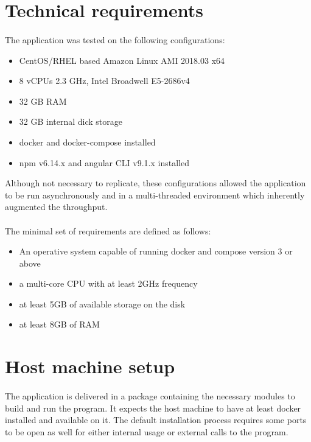 \documentclass{scrreprt}
\begin{document}
\section{Technical requirements}
\paragraph{}The application was tested on the following configurations:
\begin{itemize}
	\item CentOS/RHEL based Amazon Linux AMI 2018.03 x64
	\item 8 vCPUs 2.3 GHz, Intel Broadwell E5-2686v4
	\item 32 GB RAM
	\item 32 GB internal dick storage
	\item docker and docker-compose installed
	\item npm v6.14.x and angular CLI v9.1.x installed 
\end{itemize}
Although not necessary to replicate, these configurations allowed the application to be run asynchronously and in a multi-threaded environment which inherently augmented the throughput.


\paragraph{}The minimal set of requirements are defined as follows:
\begin{itemize}
	\item An operative system capable of running docker and compose version 3 or above
	\item a multi-core CPU with at least 2GHz  frequency
	\item at least 5GB of available storage on the disk
	\item at least 8GB of RAM
\end{itemize}


\section{Host machine setup}
\paragraph{}The application is delivered in a package containing the necessary modules to build and run the program. It expects the host machine to have at least docker installed and available on it. The default installation process requires some ports to be open as well for either internal usage or external calls to the program.
\end{document}
